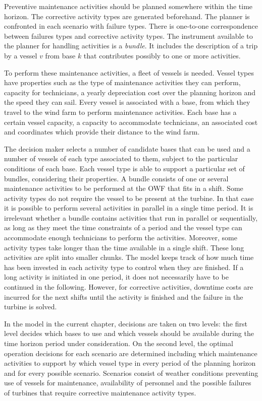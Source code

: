 Preventive maintenance activities should be planned somewhere within the time horizon. The corrective activity types are generated beforehand. The planner is confronted in each scenario with failure types. There is one-to-one correspondence between failures types and corrective activity types. The instrument available to the planner for handling activities is a \emph{bundle}. It includes the description of a trip by a vessel $v$ from base $k$ that contributes possibly to one or more activities.


To perform these maintenance activities, a fleet of vessels is needed. Vessel types have properties such as the type of maintenance activities they can perform, capacity for technicians, a yearly depreciation cost over the planning horizon and the speed they can sail.  Every vessel is associated with a base, from which they travel to the wind farm to perform maintenance activities. Each base has a certain vessel capacity, a capacity to accommodate technicians, an associated cost and coordinates which provide their distance to the wind farm. 



The decision maker selects a number of candidate bases that can be used and a number of vessels of each type associated to them, subject to the particular conditions of each base. Each vessel type is able to support a particular set of bundles, considering their properties. A bundle consists of one or several maintenance activities to be performed at the OWF that fits in a shift.  Some activity types do not require the vessel to be present at the turbine. In that case it is possible to perform several activities in parallel in a single time period. It is irrelevant whether  a bundle contains activities that run in parallel or sequentially, as long as they meet the time constraints of a period and the vessel type can accommodate enough technicians to perform the activities. Moreover, some activity types take longer than the time available in a single shift. These long activities are split into smaller chunks. The model keeps track of how much time has been invested in each activity type to control when they are finished. If a long activity is initiated in one period, it does not necessarily have to be continued in the following. However, for corrective activities, downtime costs are incurred for the next shifts until the activity is finished and the failure in the turbine is solved.

In the model in the current chapter, decisions are taken on two levels: the first level decides which bases to use and which vessels should be available during the time horizon period under consideration. On the second level, the optimal operation decisions for each scenario are determined including which maintenance activities to support by which vessel type in every period of the planning horizon and for every possible scenario. Scenarios
consist of weather conditions preventing use of vessels for maintenance, availability of personnel and the possible failures of turbines that require corrective maintenance activity types.




